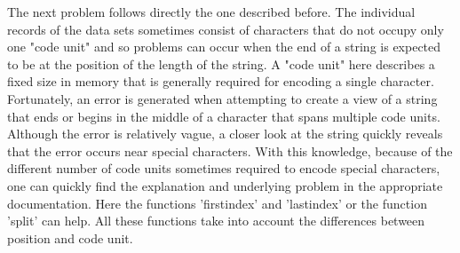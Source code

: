 The next problem follows directly the one described before. The individual records of the data sets sometimes consist of characters that do not occupy only one "code unit" and so problems can occur when the end of a string is expected to be at the position of the length of the string. A "code unit" here describes a fixed size in memory that is generally required for encoding a single character. Fortunately, an error is generated when attempting to create a view of a string that ends or begins in the middle of a character that spans multiple code units. Although the error is relatively vague, a closer look at the string quickly reveals that the error occurs near special characters. With this knowledge, because of the different number of code units sometimes required to encode special characters, one can quickly find the explanation and underlying problem in the appropriate documentation. Here the functions 'firstindex' and 'lastindex' or the function 'split' can help. All these functions take into account the differences between position and code unit. 

